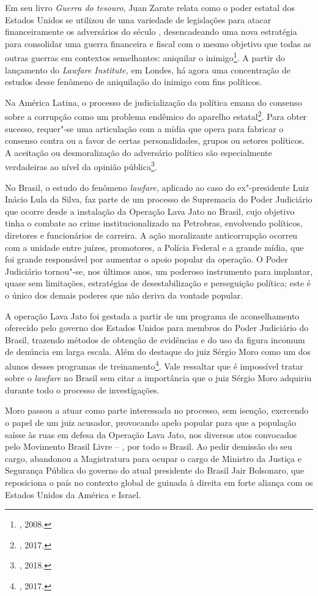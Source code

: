 Em seu livro \emph{Guerra do tesouro}, Juan Zarate relata como o poder estatal
dos Estados Unidos se utilizou de uma variedade de legislações para
atacar financeiramente os adversários do século , desencadeando uma
nova estratégia para consolidar uma guerra financeira e fiscal com o
mesmo objetivo que todas as outras guerras em contextos semelhantes:
aniquilar o inimigo\footnote{, 2008.}. A partir do lançamento do
\emph{Lawfare Institute,} em Londes, há agora uma concentração de
estudos desse fenômeno de aniquilação do inimigo com fins políticos.

Na América Latina, o processo de judicialização da política emana do
consenso sobre a corrupção como um problema endêmico do aparelho estatal\footnote{, 2017.}. Para obter sucesso, requer"-se uma articulação com a
mídia que opera para fabricar o consenso contra ou a favor de certas
personalidades, grupos ou setores políticos. A aceitação ou
desmoralização do adversário político são especialmente verdadeiras ao
nível da opinião pública\footnote{, 2018.}.

No Brasil, o estudo do fenômeno \emph{lawfare,} aplicado ao caso do
ex"-presidente Luiz Inácio Lula da Silva, faz parte de um processo de
Supremacia do Poder Judiciário que ocorre desde a instalação da Operação
Lava Jato no Brasil, cujo objetivo tinha o combate ao crime
institucionalizado na Petrobras, envolvendo políticos, diretores e
funcionários de carreira. A ação moralizante anticorrupção ocorreu com a
unidade entre juízes, promotores, a Polícia Federal e a grande mídia,
que foi grande responsável por aumentar o apoio popular da operação. O
Poder Judiciário tornou"-se, nos últimos anos, um poderoso instrumento
para implantar, quase sem limitações, estratégias de desestabilização e
perseguição política; este é o único dos demais poderes que não deriva
da vontade popular.

A operação Lava Jato foi gestada a partir de um programa de
aconselhamento oferecido pelo governo dos Estados Unidos para membros do
Poder Judiciário do Brasil, trazendo métodos de obtenção de evidências e
do uso da figura incomum de denúncia em larga escala. Além do destaque
do juiz Sérgio Moro como um dos alunos desses programas de treinamento\footnote{, 2017.}. Vale ressaltar que é impossível tratar sobre o
\emph{lawfare} no Brasil sem citar a importância que o juiz Sérgio Moro
adquiriu durante todo o processo de investigações.

Moro passou a atuar como parte interessada no processo, sem isenção,
exercendo o papel de um juiz acusador, provocando apelo popular para que
a população saísse às ruas em defesa da Operação Lava Jato, nos diversos
atos convocados pelo Movimento Brasil Livre -- , por todo o Brasil.
Ao pedir demissão do seu cargo, abandonou a Magistratura para ocupar o
cargo de Ministro da Justiça e Segurança Pública do governo do atual
presidente do Brasil Jair Bolsonaro, que reposiciona o país no contexto
global de guinada à direita em forte aliança com os Estados Unidos da
América e Israel.

